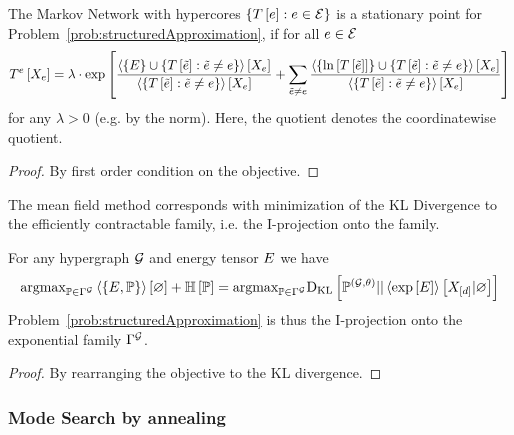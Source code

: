 \begin{theorem}
	The Markov Network with hypercores $\{ T\left[e\right] : e\in\mathcal{E} \}$ is a stationary point for Problem~\ref{prob:structuredApproximation}, if for all $e\in\mathcal{E}$
	\begin{align*}
	T^{e}\left[X_{e}\right]
	= \lambda\cdot \mathrm{exp}\left[
	\frac{
		\left\langle \{E\}\cup\{
		T\left[\tilde{e}\right] : \tilde{e}\neq e
		\}\right\rangle \left[ X_{e} \right] 
	}{
		\left\langle \{
		T\left[\tilde{e}\right] : \tilde{e}\neq e
		\}\right\rangle \left[ X_{e} \right] 
	}
	+ \sum_{\tilde{e}\neq e} 
		\frac{
		\left\langle \{\ln \left[ T\left[\tilde{e}\right] \right]\}\cup\{
		T\left[\tilde{e}\right] : \tilde{e}\neq e
		\}\right\rangle \left[ X_{e} \right] 
	}{
		\left\langle \{
		T\left[\tilde{e}\right] : \tilde{e}\neq e
		\}\right\rangle \left[ X_{e} \right] 
	}
	\right]
	\end{align*}
	for any $\lambda>0$ (e.g. by the norm).
	Here, the quotient denotes the coordinatewise quotient.
\end{theorem}
\begin{proof}
	By first order condition on the objective.
\end{proof}

The mean field method corresponds with minimization of the KL Divergence to the efficiently contractable family, i.e. the I-projection onto the family.

\begin{theorem}
	For any hypergraph $\mathcal{G}$ and energy tensor $E$ we have 
	\begin{align*}
		\mathrm{argmax}_{\mathbb{P}\in \Gamma^{\mathcal{G}}} \left\langle \left\{E, \mathbb{P}\right\}\right\rangle \left[ \varnothing \right]+ \mathbb{H}\left[\mathbb{P}\right]
		= \mathrm{argmax}_{\mathbb{P}\in \Gamma^{\mathcal{G}}} \mathrm{D}_{\mathrm{KL}}\left[ \mathbb{P}^{(\mathcal{G},\theta)} || \left\langle \mathrm{exp}\left[E\right]\right\rangle \left[ X_{[d]} | \varnothing \right] \right]
	\end{align*}
	Problem~\ref{prob:structuredApproximation} is thus the I-projection onto the exponential family $\Gamma^{\mathcal{G}}$.
\end{theorem}
\begin{proof}
	By rearranging the objective to the KL divergence.
\end{proof}


\subsubsection{Mode Search by annealing}

